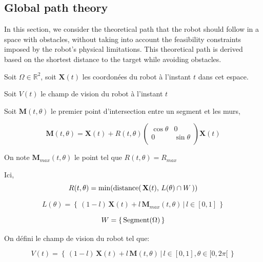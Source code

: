 \documentclass[../main.tex]{subfiles}
\begin{document}
\subsection{Global path theory}
In this section, we consider the theoretical path that the robot should follow in a space with obstacles, without taking into account the feasibility constraints imposed by the robot's physical limitations. This theoretical path is derived based on the shortest distance to the target while avoiding obstacles.

Soit $\Omega \in \mathbb{R}^{2}$, soit $\mathbf{X}(t)$ les coordonées du robot à l'instant $t$ dans cet espace.


Soit $ V(t)$ le champ de vision du robot à l'instant $t$

Soit $\mathbf{M}(t, \theta)$ le premier point d'intersection entre un segment et les murs, 

\begin{equation*}
    \displaystyle
    \mathbf{M}(t, \theta) = \mathbf{X}(t) + R(t, \theta) 
    \begin{pmatrix}
        \cos \theta & 0\\
        0 & \sin \theta\\
    \end{pmatrix} 
    \mathbf{X}(t)
\end{equation*}

On note $\mathbf{M}_{max} (t, \theta)$ le point tel que $R(t, \theta) = R_{max}$

Ici,
\begin{equation*}
    \displaystyle
    R(t, \theta) = \min (\text{\rmfamily distance}( \, \mathbf{X}(t), \, L(\theta) \cap W \,))
\end{equation*}

\begin{equation*}
    \displaystyle
    L(\theta) = \left\{ \, (1 - l) \, \mathbf{X}(t) + l\, \mathbf{M}_{max}(t, \theta) \,|\, l \in [0, 1]\, \right\}
\end{equation*}

\begin{equation*}
    \displaystyle
    W = \left\{ \, \text{\rmfamily Segment} (\Omega)\, \right\}
\end{equation*}

On défini le champ de vision du robot tel que:


\begin{equation}
    \displaystyle
    V(t) = \left\{ \, (1 - l) \, \mathbf{X}(t) + l\, \mathbf{M}(t, \theta) \,|\, l \in [0, 1], \theta \in [0, 2 \pi[ \, \right\}
\end{equation}
\end{document}
